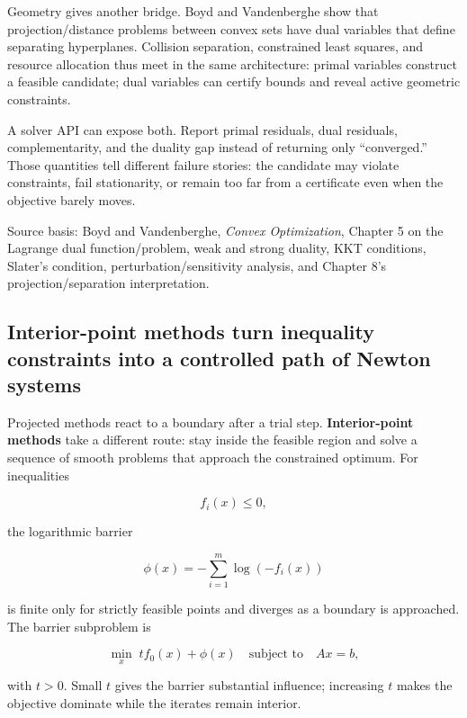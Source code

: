 Geometry gives another bridge. Boyd and Vandenberghe show that projection/distance problems between convex sets have dual variables that define separating hyperplanes. Collision separation, constrained least squares, and resource allocation thus meet in the same architecture: primal variables construct a feasible candidate; dual variables can certify bounds and reveal active geometric constraints.

A solver API can expose both. Report primal residuals, dual residuals, complementarity, and the duality gap instead of returning only ``converged.'' Those quantities tell different failure stories: the candidate may violate constraints, fail stationarity, or remain too far from a certificate even when the objective barely moves.

Source basis: Boyd and Vandenberghe, \emph{Convex Optimization}, Chapter 5 on the Lagrange dual function/problem, weak and strong duality, KKT conditions, Slater's condition, perturbation/sensitivity analysis, and Chapter 8's projection/separation interpretation.

\subsection{Interior-point methods turn inequality constraints into a controlled path of Newton systems}\label{02-foundations-ii-ch026-interior-point-methods-turn-inequality-constraints-into-a-controlled-path-of-newton-systems}

\hypertarget{02-foundations-ii-ch026-interior-point-methods-turn-inequality-constraints-into-a-controlled-path-of-newton-systems}{}

Projected methods react to a boundary after a trial step. \textbf{Interior-point methods} take a different route: stay inside the feasible region and solve a sequence of smooth problems that approach the constrained optimum. For inequalities

\[
f_i(x)\le0,
\]

the logarithmic barrier

\[
\phi(x)
=
-\sum_{i=1}^{m}\log(-f_i(x))
\]

is finite only for strictly feasible points and diverges as a boundary is approached. The barrier subproblem is

\[
\min_x\;
t f_0(x)+\phi(x)
\quad
\text{subject to}\quad Ax=b,
\]

with \(t>0\). Small \(t\) gives the barrier substantial influence; increasing \(t\) makes the objective dominate while the iterates remain interior.

